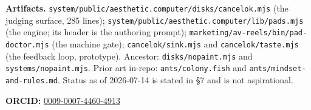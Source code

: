 \documentclass[10pt,letterpaper,twocolumn]{article}
\begin{document}
\vspace{0.5em}
\noindent\textbf{Artifacts.} \texttt{system/public/aesthetic.computer/disks/cancelok.mjs} (the judging surface, 285 lines); \texttt{system/public/aesthetic.computer/lib/pads.mjs} (the engine; its header is the authoring prompt); \texttt{marketing/av-reels/bin/pad-doctor.mjs} (the machine gate); \texttt{cancelok/sink.mjs} and \texttt{cancelok/taste.mjs} (the feedback loop, prototype). Ancestor: \texttt{disks/nopaint.mjs} and \texttt{systems/nopaint.mjs}. Prior art in-repo: \texttt{ants/colony.fish} and \texttt{ants/mindset-and-rules.md}. Status as of 2026-07-14 is stated in \S7 and is not aspirational.

\vspace{0.5em}
\noindent\textbf{ORCID:} \href{https://orcid.org/0009-0007-4460-4913}{0009-0007-4460-4913}




\end{document}
